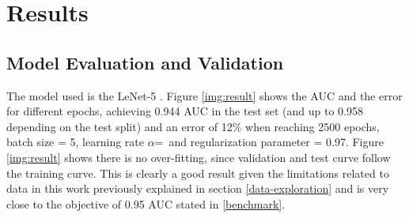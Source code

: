 \documentclass[]{article}
\begin{document}
\section{Results}\label{iv.-results}


\subsection{Model Evaluation and Validation}\label{model-evaluation-and-validation}

The model used is the LeNet-5 \cite{Lecun98}. Figure \ref{img:result} shows the AUC and the error for different epochs, achieving 0.944 AUC in the test set (and up to 0.958 depending on the test split) and an error of 12\% when reaching 2500 epochs, batch size = 5, learning rate $\alpha$=\lr  \, and regularization parameter = 0.97. Figure \ref{img:result} shows there is no over-fitting, since validation and test curve follow the training curve.  This is clearly a good result given the limitations related to data in this work previously explained in section \ref{data-exploration} and is very close to the objective of 0.95 AUC stated in \ref{benchmark}.
\end{document}
